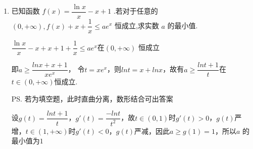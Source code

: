 \begin{enumerate}
\begin{jieda}
            构造函数 $f\left( x\right)  = {{e}}^{x} + x$ ,则 $f\left( x\right)$ 是 $\mathbf{R}$ 上的增函数,则由 $f\left( x\right)  \geq  f\left( {\ln \left( {mx}\right) }\right)$ 得: $x \geq  \ln \left( {mx}\right)$，即 $m \leq  \dfrac{{{e}}^{x}}{x}$
            
            令 $g\left( x\right)  = \dfrac{{{e}}^{x}}{x},x \in  \left( {0, + \infty }\right) ,{g}^{\prime }\left( x\right)  = \dfrac{\left( {x - 1}\right) {{e}}^{x}}{{x}^{2}}$，当 $x \in  \left( {0,1}\right)$ , ${g}^{\prime }\left( x\right)  < 0$ ,则 $g\left( x\right)$ 单调递减，当 $x \in  \left( {1, + \infty }\right)$ , ${g}^{\prime }\left( x\right)  > 0$ ,则 $g\left( x\right)$ 单调递增
            
            故$g{\left( x\right) }_{\min } = g\left( 1\right)  = {e}$ ,则 $m \leq  {e}$ ,又 $m > 0$ ,则 $0 < m \leq  {e}$ .
        \end{jieda}

        
        \item 已知函数 $f\left( x\right)  = \dfrac{\ln x}{x} - x + 1$ .若对于任意的 $\left( {0, + \infty }\right) ,f\left( x\right)  +x+ \dfrac{1}{x} \leq  a{e}^{x}$ 恒成立,求实数 $a$ 的最小值.
        \begin{jieda}
            $\dfrac{\ln x}{x} - x + x + 1 + \dfrac{1}{x} \leq ae^x$在$\left( {0, + \infty }\right)$ 恒成立

            即$a \geq \dfrac{lnx+x+1}{xe^x}$， 令$t = xe^x$，则$lnt = x + lnx$，故有$a \geq \dfrac{lnt+1}{t}$在$t \in (0, +\infty)$恒成立.

            \ps 若为填空题，此时直曲分离，数形结合可出答案

            设$g(t) = \dfrac{lnt+1}{t}$，$g'(t) = \dfrac{-lnt}{t^2}$，故$t \in (0, 1)$时$g'(t) > 0$，$g(t)$严增，$t \in (1, +\infty)$时$g'(t) < 0$，$g(t)$严减，因此$a \geq g(1) = 1$，所以$a$ 的最小值为$1$
        \end{jieda}
\end{enumerate}
